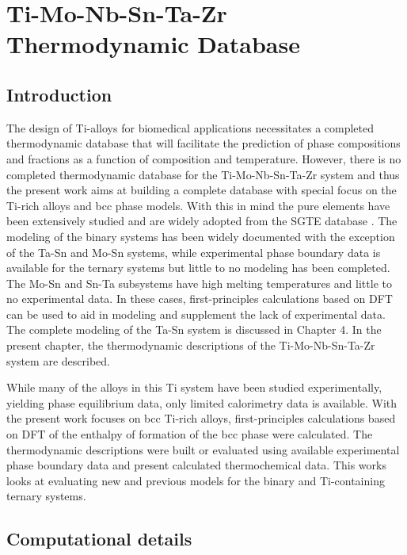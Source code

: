 \chapter{Ti-Mo-Nb-Sn-Ta-Zr Thermodynamic Database}

\section{Introduction}

The design of Ti-alloys for biomedical applications necessitates a completed thermodynamic database that will facilitate the prediction of phase compositions and fractions as a function of composition and temperature. However, there is no completed thermodynamic database for the Ti-Mo-Nb-Sn-Ta-Zr system and thus the present work aims at building a complete database with special focus on the Ti-rich alloys and bcc phase models. With this in mind the pure elements have been extensively studied and are widely adopted from the SGTE database \cite{Dinsdale1991}. The modeling of the binary systems has been widely documented with the exception of the Ta-Sn and Mo-Sn systems, while experimental phase boundary data is available for the ternary systems but little to no modeling has been completed. The Mo-Sn and Sn-Ta subsystems have high melting temperatures and little to no experimental data. In these cases, first-principles calculations based on DFT can be used to aid in modeling and supplement the lack of experimental data. The complete modeling of the Ta-Sn system is discussed in Chapter 4. In the present chapter, the thermodynamic descriptions of the Ti-Mo-Nb-Sn-Ta-Zr system are described. 

While many of the alloys in this Ti system have been studied experimentally, yielding phase equilibrium data, only limited calorimetry data is available. With the present work focuses on bcc Ti-rich alloys, first-principles calculations based on DFT of the enthalpy of formation of the bcc phase were calculated. The thermodynamic descriptions were built or evaluated using available experimental phase boundary data and present calculated thermochemical data. This works looks at evaluating new and previous models for the binary and Ti-containing ternary systems. 

\section{Computational details}


